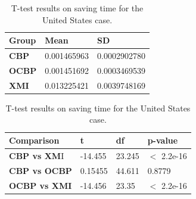 \documentclass{llncs}
\begin{document}
    \begin{table}[ht]
        \centering
        \label{table:ttest_save_time_wikipedia}
        \caption{T-test results on saving time for the United States case.}
        \begin{minipage}{0.44\textwidth}
            \centering
            \begin{tabular}{|p{}|p{}|p{}|}
                \hline 
                \textbf{Group}  & \textbf{Mean} & \textbf{SD} \\ 
                \hline 
                \textbf{CBP} & 0.001465963     &0.0002902780 \\ 
                \hline 
                \textbf{OCBP} & 0.001451692  &  0.0003469539 \\ 
                \hline 
                \textbf{XMI} & 0.013225421  & 0.0039748169 \\ 
                \hline 
            \end{tabular} 
        \end{minipage}
        \hfill
        \begin{minipage}{0.54\textwidth}
            \centering
            \begin{tabular}{|p{}|p{}|p{}|p{}|}
                \hline 
                \textbf{Comparison} & \textbf{t}  & \textbf{df} & \textbf{p-value} \\ 
                \hline 
                \textbf{CBP vs XM}I &-14.455   & 23.245 & $<$ 2.2e-16 \\ 
                \hline 
                \textbf{CBP vs OCBP} &   0.15455 & 44.611 & 0.8779 \\ 
                \hline 
                \textbf{OCBP vs XMI} & -14.456   & 23.35 & $<$ 2.2e-16 \\ 
                \hline 
            \end{tabular} 
        \end{minipage}
    \end{table}
    
\end{document}
